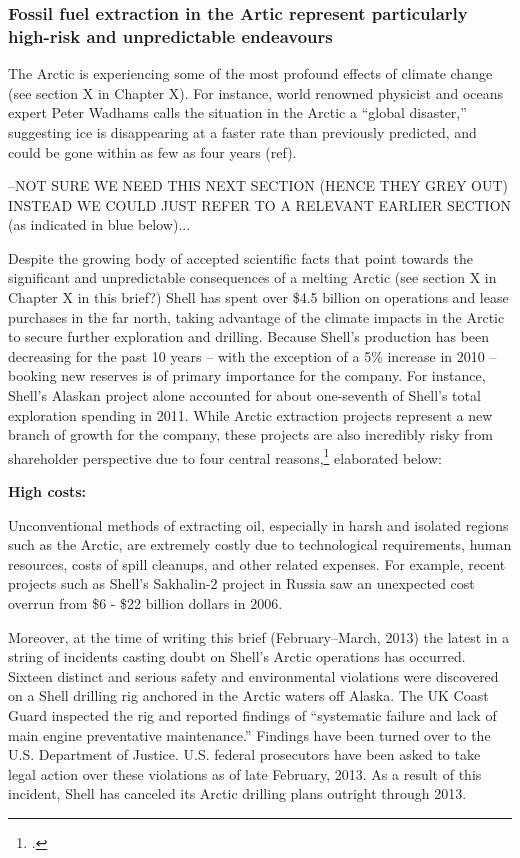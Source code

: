 	\subsubsection{Fossil fuel extraction in the Artic represent particularly high-risk and      
	         unpredictable endeavours}

The Arctic is experiencing some of the most profound effects of climate change (see section X in Chapter X). 
For instance, world renowned physicist and oceans expert Peter Wadhams calls the situation in the Arctic a ``global disaster,'' suggesting ice is disappearing at a faster rate than previously predicted, and could be gone within as few as four years (ref). 



\begin{vcom}
–NOT SURE WE NEED THIS NEXT SECTION (HENCE THEY GREY OUT) INSTEAD WE COULD JUST REFER TO A RELEVANT EARLIER SECTION (as indicated in blue below)...
\end{vcom}



Despite the growing body of accepted scientific facts that point towards the significant and unpredictable consequences of a melting Arctic (see section X in Chapter X in this brief?) Shell has spent over \$4.5 billion on operations and lease purchases in the far north, taking advantage of the climate impacts in the Arctic to secure further exploration and drilling. 
Because Shell’s production has been decreasing for the past 10 years – with the exception of a 5\% increase in 2010 –booking new reserves is of primary importance for the company. 
For instance, Shell's Alaskan project alone accounted for about one-seventh of Shell's total exploration spending in 2011. 
While Arctic extraction projects represent a new branch of growth for the company, these projects are also incredibly risky from shareholder perspective due to four central reasons,\footcite[For more on these four central risk factors see][]{OutInTheCold_2012}  elaborated below:

\textbf{High costs:} 

Unconventional methods of extracting oil, especially in harsh and isolated regions such as the Arctic, are extremely costly due to technological requirements, human resources, costs of spill cleanups, and other related expenses. 
For example, recent projects such as Shell’s Sakhalin-2 project in Russia saw an unexpected cost overrun from \$6 - \$22 billion dollars in 2006. 

Moreover, at the time of writing this brief (February--March, 2013) the latest in a string of incidents casting doubt on Shell’s Arctic operations has occurred. 
Sixteen distinct and serious safety and environmental violations were discovered on a Shell drilling rig anchored in the Arctic waters off Alaska. 
The UK Coast Guard inspected the rig and reported findings of ``systematic failure and lack of main engine preventative maintenance.'' 
Findings have been turned over to the U.S. Department of Justice. U.S. federal prosecutors have been asked to take legal action over these violations as of late February, 2013. 
As a result of this incident, Shell has canceled its Arctic drilling plans outright through 2013.



